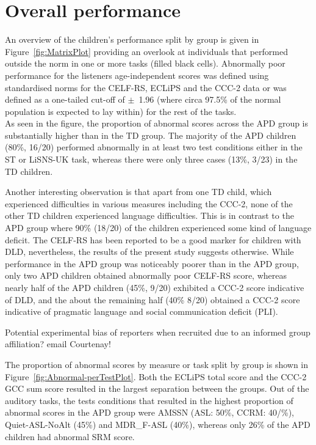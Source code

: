\documentclass[a4paper, twoside]{templates/ociamthesis}
\begin{document}
\hypertarget{overall-performance}{%
\section{Overall performance}\label{overall-performance}}

An overview of the children's performance split by group is given in Figure~\ref{fig:MatrixPlot} providing an overlook at individuals that performed outside the norm in one or more tasks (filled black cells). Abnormally poor performance for the listeners age-independent scores was defined using standardised norms for the CELF-RS, ECLiPS and the CCC-2 data or was defined as a one-tailed cut-off of \(\pm\)~1.96 (where circa 97.5\% of the normal population is expected to lay within) for the rest of the tasks.\\

As seen in the figure, the proportion of abnormal scores across the APD group is substantially higher than in the TD group. The majority of the APD children (80\%, 16/20) performed abnormally in at least two test conditions either in the ST or LiSNS-UK task, whereas there were only three cases (13\%, 3/23) in the TD children.

Another interesting observation is that apart from one TD child, which experienced difficulties in various measures including the CCC-2, none of the other TD children experienced language difficulties. This is in contrast to the APD group where 90\% (18/20) of the children experienced some kind of language deficit. The CELF-RS has been reported to be a good marker for children with DLD, nevertheless, the results of the present study suggests otherwise. While performance in the APD group was noticeably poorer than in the APD group, only two APD children obtained abnormally poor CELF-RS score, whereas nearly half of the APD children (45\%, 9/20) exhibited a CCC-2 score indicative of DLD, and the about the remaining half (40\% 8/20) obtained a CCC-2 score indicative of pragmatic language and social communication deficit (PLI).

\begin{correction}
{Potential experimental bias of reporters when recruited due to an
informed group affiliation? email Courtenay!}
\end{correction}

\hfill\break
The proportion of abnormal scores by measure or task split by group is shown in Figure~\ref{fig:Abnormal-perTestPlot}. Both the ECLiPS total score and the CCC-2 GCC sum score resulted in the largest separation between the groups. Out of the auditory tasks, the tests conditions that resulted in the highest proportion of abnormal scores in the APD group were AMSSN (ASL: 50\%, CCRM: 40/\%), Quiet-ASL-NoAlt (45\%) and MDR\_F-ASL (40\%), whereas only 26\% of the APD children had abnormal SRM score.\\
\end{document}
